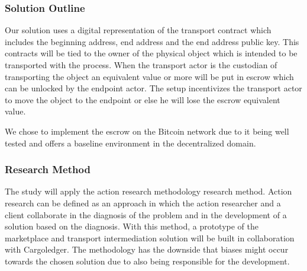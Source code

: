 
\subsubsection{Solution Outline}

Our solution uses a digital representation of the transport contract which includes the beginning address, end address and the end address public key. This contracts will be tied to the owner of the physical object which is intended to be transported with the process. When the transport actor is the custodian of transporting the object an equivalent value or more will be put in escrow which can be unlocked by the endpoint actor. The setup incentivizes the transport actor to move the object to the endpoint or else he will lose the escrow equivalent value. \par
We chose to implement the escrow on the Bitcoin network due to it being well tested and offers a baseline environment in the decentralized domain.

%

\subsubsection{Research Method}

The study will apply the action research methodology research method. Action research can be defined as an approach in which the action researcher and a client collaborate in the diagnosis of the problem and in the development of a solution based on the diagnosis. With this method, a prototype of the marketplace and transport intermediation solution will be built in collaboration with Cargoledger. The methodology has the downside that biases might occur towards the chosen solution due to also being responsible for the development.\par

